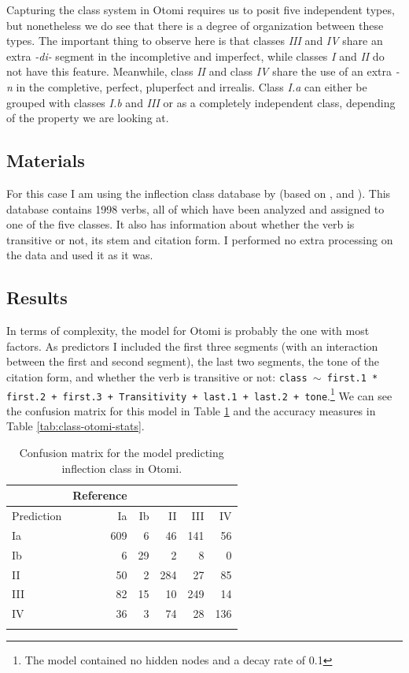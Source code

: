Capturing the class system in Otomi requires us to posit five independent types, but nonetheless we do see that there is a degree of organization between these types. The important thing to observe here is that classes \textit{III} and \textit{IV} share an extra \textit{-di-} segment in the incompletive and imperfect, while classes \textit{I} and \textit{II} do not have this feature. Meanwhile, class \textit{II} and class \textit{IV} share the use of an extra \textit{-n} in the completive, perfect, pluperfect and irrealis. Class \textit{I.a} can either be grouped with classes \textit{I.b} and \textit{III} or as a completely independent class, depending of the property we are looking at.

\subsection{Materials}

For this case I am using the inflection class database by \textcite{Feist.2015} (based on \cite{Echegoyen.1979}, \cite{Echegoyen.2007} and \cite{Voigtlander.2007}). This database contains 1998 verbs, all of which have been analyzed and assigned to one of the five classes. It also has information about whether the verb is transitive or not, its stem and citation form. I performed no extra processing on the data and used it as it was.

\subsection{Results}

In terms of complexity, the model for Otomi is probably the one with most factors. As predictors I included the first three segments (with an interaction between the first and second segment), the last two segments, the tone of the citation form, and whether the verb is transitive or not: \texttt{class $\sim$ first.1 * first.2 + first.3 + Transitivity + last.1 + last.2 + tone}.\footnote{The model contained no hidden nodes and a decay rate of 0.1} We can see the confusion matrix for this model in Table \ref{tab:class-otomi-cm} and the accuracy measures in Table \ref{tab:class-otomi-stats}.

\begin{table}[!htpb]
  \centering
  \begin{tabular}{lrrrrr}
    \lsptoprule
               & Reference                  \\
    \midrule
    Prediction & Ia  & Ib & II  & III & IV  \\
    Ia         & 609 & 6  & 46  & 141 & 56  \\
    Ib         & 6   & 29 & 2   & 8   & 0   \\
    II         & 50  & 2  & 284 & 27  & 85  \\
    III        & 82  & 15 & 10  & 249 & 14  \\
    IV         & 36  & 3  & 74  & 28  & 136 \\
    \lspbottomrule
  \end{tabular}
    \caption{Confusion matrix for the model predicting inflection class in Otomi.}
  \label{tab:class-otomi-cm}
\end{table}

